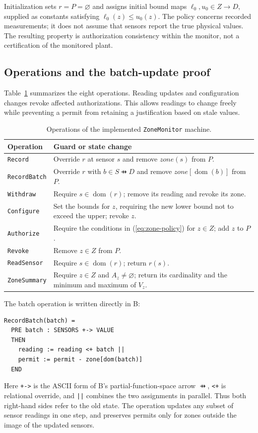 Initialization sets $r=P=\varnothing$ and assigns initial bound maps
$\ell_0,u_0\in Z\to D$, supplied as constants satisfying
$\ell_0(z)\le u_0(z)$. The policy concerns recorded measurements; it does
not assume that sensors report the true physical values. The resulting
property is authorization consistency within the monitor, not a
certification of the monitored plant.

\subsection{Operations and the batch-update proof}

Table~\ref{tab:zone-operations} summarizes the eight operations. Reading
updates and configuration changes revoke affected authorizations. This
allows readings to change freely while preventing a permit from retaining
a justification based on stale values.

\begin{table}[tb]
\caption{Operations of the implemented \texttt{ZoneMonitor} machine.}
\label{tab:zone-operations}
\small
\begin{tabularx}{\textwidth}{@{}lX@{}}
\toprule
Operation & Guard or state change \\
\midrule
\texttt{Record} & Override $r$ at sensor $s$ and remove $\mathit{zone}(s)$ from $P$. \\
\texttt{RecordBatch} & Override $r$ with $b\in S\pfun D$ and remove $\mathit{zone}[\operatorname{dom}(b)]$ from $P$. \\
\texttt{Withdraw} & Require $s\in\operatorname{dom}(r)$; remove its reading and revoke its zone. \\
\texttt{Configure} & Set the bounds for $z$, requiring the new lower bound not to exceed the upper; revoke $z$. \\
\texttt{Authorize} & Require the conditions in (\ref{eq:zone-policy}) for $z\in Z$; add $z$ to $P$. \\
\texttt{Revoke} & Remove $z\in Z$ from $P$. \\
\texttt{ReadSensor} & Require $s\in\operatorname{dom}(r)$; return $r(s)$. \\
\texttt{ZoneSummary} & Require $z\in Z$ and $A_z\ne\varnothing$; return its cardinality and the minimum and maximum of $V_z$. \\
\bottomrule
\end{tabularx}
\end{table}

The batch operation is written directly in B:
\begin{lstlisting}[language={},morekeywords={PRE,THEN,END}]
RecordBatch(batch) =
  PRE batch : SENSORS +-> VALUE
  THEN
    reading := reading <+ batch ||
    permit := permit - zone[dom(batch)]
  END
\end{lstlisting}
Here \texttt{+->} is the ASCII form of B's partial-function-space arrow
$\pfun$, \texttt{<+} is relational override, and \texttt{||} combines the
two assignments in parallel. Thus both right-hand sides refer to the
old state. The operation updates any subset of sensor readings in one
step, and preserves permits only for zones outside the image of the
updated sensors.

